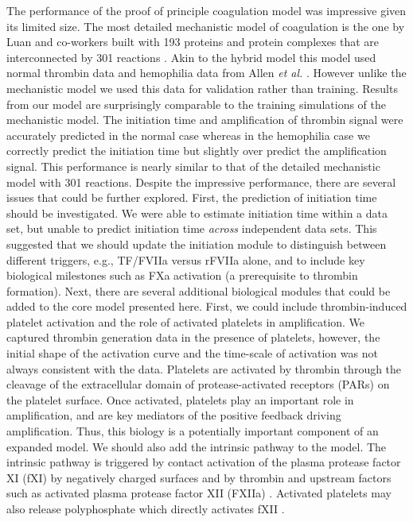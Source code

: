 \documentclass[processes,article,received,moreauthors,pdftex,12pt,a4paper]{mdpi}
\begin{document}
The performance of the proof of principle coagulation model was impressive given its limited size. The most detailed mechanistic model of coagulation is the one by Luan and co-workers built  with 193 proteins and protein complexes that are interconnected by 301 reactions \citep{2010_luan_varner_MolBioSys}. Akin to the hybrid model this model used normal thrombin data and hemophilia data from Allen \emph{et al.} \citep{ALLEN2006}. However unlike the mechanistic model we used this data for validation rather than training. Results from our model are surprisingly comparable to the training simulations of the mechanistic model. The initiation time and amplification of thrombin signal were accurately predicted in the normal case whereas in the hemophilia case we correctly predict the initiation time but slightly over predict the amplification signal. This performance is nearly similar to that of the detailed mechanistic model with 301 reactions. Despite the impressive performance, there are several issues that could be further explored. First, the prediction of initiation time should be investigated. 
We were able to estimate initiation time within a data set, but unable to predict initiation time \textit{across} independent data sets. 
This suggested that we should update the initiation module to distinguish between different triggers, e.g., TF/FVIIa versus rFVIIa alone, 
and to include key biological milestones such as FXa activation (a prerequisite to thrombin formation).
Next, there are several additional biological modules that could be added to the core model presented here. 
First, we could include thrombin-induced platelet activation and the role of activated platelets in amplification.
We captured thrombin generation data in the presence of platelets, however,
the initial shape of the activation curve and the time-scale of activation was not always consistent with the data.
Platelets are activated by thrombin through the cleavage of the extracellular domain of protease-activated receptors (PARs) on the platelet surface.
Once activated, platelets play an important role in amplification, and are key mediators of the positive feedback driving amplification.
Thus, this biology is a potentially important component of an expanded model.
We should also add the intrinsic pathway to the model. 
The intrinsic pathway is triggered by contact activation of the plasma protease factor XI (fXI) by negatively charged surfaces and by thrombin and upstream factors such as activated
plasma protease factor XII (FXIIa) \citep{NAITO1991,Gailani:1991aa}.
Activated platelets may also release polyphosphate which directly activates fXII \cite{Smith:2006zl}. 
\end{document}
